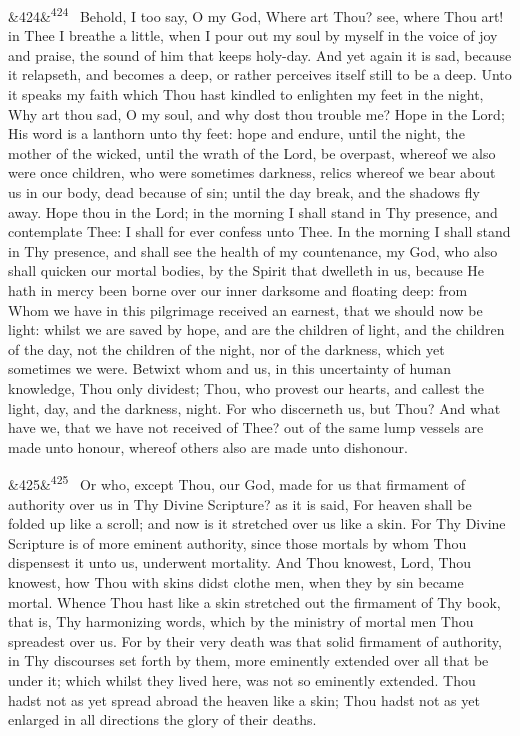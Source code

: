 \documentclass[12pt]{article}
\newcommand{\para}[1][]{\par\noindent\ifx&#1&\else\textsuperscript{\footnotesize #1}~\fi}
\begin{document}
\para[424] Behold, I too say, O my God, Where art Thou? see, where Thou art! in Thee I breathe a little, when I pour out my soul by myself in the voice of joy and praise, the sound of him that keeps holy-day. And yet again it is sad, because it relapseth, and becomes a deep, or rather perceives itself still to be a deep. Unto it speaks my faith which Thou hast kindled to enlighten my feet in the night, Why art thou sad, O my soul, and why dost thou trouble me? Hope in the Lord; His word is a lanthorn unto thy feet: hope and endure, until the night, the mother of the wicked, until the wrath of the Lord, be overpast, whereof we also were once children, who were sometimes darkness, relics whereof we bear about us in our body, dead because of sin; until the day break, and the shadows fly away. Hope thou in the Lord; in the morning I shall stand in Thy presence, and contemplate Thee: I shall for ever confess unto Thee. In the morning I shall stand in Thy presence, and shall see the health of my countenance, my God, who also shall quicken our mortal bodies, by the Spirit that dwelleth in us, because He hath in mercy been borne over our inner darksome and floating deep: from Whom we have in this pilgrimage received an earnest, that we should now be light: whilst we are saved by hope, and are the children of light, and the children of the day, not the children of the night, nor of the darkness, which yet sometimes we were. Betwixt whom and us, in this uncertainty of human knowledge, Thou only dividest; Thou, who provest our hearts, and callest the light, day, and the darkness, night. For who discerneth us, but Thou? And what have we, that we have not received of Thee? out of the same lump vessels are made unto honour, whereof others also are made unto dishonour.

\para[425] Or who, except Thou, our God, made for us that firmament of authority over us in Thy Divine Scripture? as it is said, For heaven shall be folded up like a scroll; and now is it stretched over us like a skin. For Thy Divine Scripture is of more eminent authority, since those mortals by whom Thou dispensest it unto us, underwent mortality. And Thou knowest, Lord, Thou knowest, how Thou with skins didst clothe men, when they by sin became mortal. Whence Thou hast like a skin stretched out the firmament of Thy book, that is, Thy harmonizing words, which by the ministry of mortal men Thou spreadest over us. For by their very death was that solid firmament of authority, in Thy discourses set forth by them, more eminently extended over all that be under it; which whilst they lived here, was not so eminently extended. Thou hadst not as yet spread abroad the heaven like a skin; Thou hadst not as yet enlarged in all directions the glory of their deaths.
\end{document}
